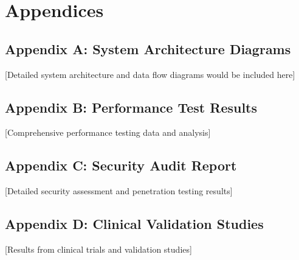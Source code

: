 \documentclass[12pt,a4paper]{article}
\begin{document}
\section{Appendices}

\subsection{Appendix A: System Architecture Diagrams}

[Detailed system architecture and data flow diagrams would be included here]

\subsection{Appendix B: Performance Test Results}

[Comprehensive performance testing data and analysis]

\subsection{Appendix C: Security Audit Report}

[Detailed security assessment and penetration testing results]

\subsection{Appendix D: Clinical Validation Studies}

[Results from clinical trials and validation studies]
\end{document}

